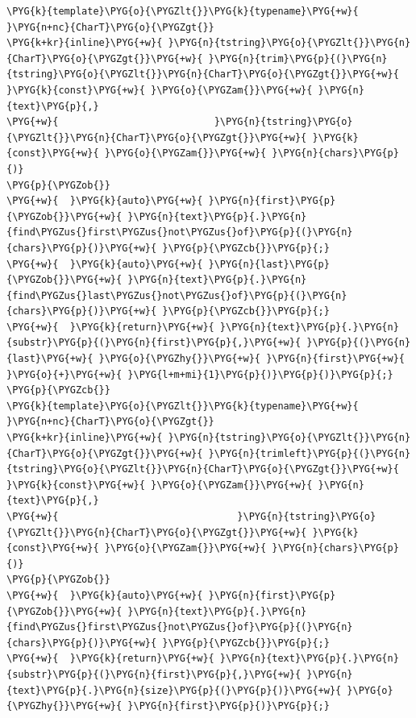 \begin{codeblockbg}
\begin{Verbatim}[commandchars=\\\{\},breaklines=true,breakanywhere=true,fontsize=\codefont,xleftmargin=17bp]
\PYG{k}{template}\PYG{o}{\PYGZlt{}}\PYG{k}{typename}\PYG{+w}{ }\PYG{n+nc}{CharT}\PYG{o}{\PYGZgt{}}
\PYG{k+kr}{inline}\PYG{+w}{ }\PYG{n}{tstring}\PYG{o}{\PYGZlt{}}\PYG{n}{CharT}\PYG{o}{\PYGZgt{}}\PYG{+w}{ }\PYG{n}{trim}\PYG{p}{(}\PYG{n}{tstring}\PYG{o}{\PYGZlt{}}\PYG{n}{CharT}\PYG{o}{\PYGZgt{}}\PYG{+w}{ }\PYG{k}{const}\PYG{+w}{ }\PYG{o}{\PYGZam{}}\PYG{+w}{ }\PYG{n}{text}\PYG{p}{,}
\PYG{+w}{                           }\PYG{n}{tstring}\PYG{o}{\PYGZlt{}}\PYG{n}{CharT}\PYG{o}{\PYGZgt{}}\PYG{+w}{ }\PYG{k}{const}\PYG{+w}{ }\PYG{o}{\PYGZam{}}\PYG{+w}{ }\PYG{n}{chars}\PYG{p}{)}
\PYG{p}{\PYGZob{}}
\PYG{+w}{  }\PYG{k}{auto}\PYG{+w}{ }\PYG{n}{first}\PYG{p}{\PYGZob{}}\PYG{+w}{ }\PYG{n}{text}\PYG{p}{.}\PYG{n}{find\PYGZus{}first\PYGZus{}not\PYGZus{}of}\PYG{p}{(}\PYG{n}{chars}\PYG{p}{)}\PYG{+w}{ }\PYG{p}{\PYGZcb{}}\PYG{p}{;}
\PYG{+w}{  }\PYG{k}{auto}\PYG{+w}{ }\PYG{n}{last}\PYG{p}{\PYGZob{}}\PYG{+w}{ }\PYG{n}{text}\PYG{p}{.}\PYG{n}{find\PYGZus{}last\PYGZus{}not\PYGZus{}of}\PYG{p}{(}\PYG{n}{chars}\PYG{p}{)}\PYG{+w}{ }\PYG{p}{\PYGZcb{}}\PYG{p}{;}
\PYG{+w}{  }\PYG{k}{return}\PYG{+w}{ }\PYG{n}{text}\PYG{p}{.}\PYG{n}{substr}\PYG{p}{(}\PYG{n}{first}\PYG{p}{,}\PYG{+w}{ }\PYG{p}{(}\PYG{n}{last}\PYG{+w}{ }\PYG{o}{\PYGZhy{}}\PYG{+w}{ }\PYG{n}{first}\PYG{+w}{ }\PYG{o}{+}\PYG{+w}{ }\PYG{l+m+mi}{1}\PYG{p}{)}\PYG{p}{)}\PYG{p}{;}
\PYG{p}{\PYGZcb{}}
\PYG{k}{template}\PYG{o}{\PYGZlt{}}\PYG{k}{typename}\PYG{+w}{ }\PYG{n+nc}{CharT}\PYG{o}{\PYGZgt{}}
\PYG{k+kr}{inline}\PYG{+w}{ }\PYG{n}{tstring}\PYG{o}{\PYGZlt{}}\PYG{n}{CharT}\PYG{o}{\PYGZgt{}}\PYG{+w}{ }\PYG{n}{trimleft}\PYG{p}{(}\PYG{n}{tstring}\PYG{o}{\PYGZlt{}}\PYG{n}{CharT}\PYG{o}{\PYGZgt{}}\PYG{+w}{ }\PYG{k}{const}\PYG{+w}{ }\PYG{o}{\PYGZam{}}\PYG{+w}{ }\PYG{n}{text}\PYG{p}{,}
\PYG{+w}{                               }\PYG{n}{tstring}\PYG{o}{\PYGZlt{}}\PYG{n}{CharT}\PYG{o}{\PYGZgt{}}\PYG{+w}{ }\PYG{k}{const}\PYG{+w}{ }\PYG{o}{\PYGZam{}}\PYG{+w}{ }\PYG{n}{chars}\PYG{p}{)}
\PYG{p}{\PYGZob{}}
\PYG{+w}{  }\PYG{k}{auto}\PYG{+w}{ }\PYG{n}{first}\PYG{p}{\PYGZob{}}\PYG{+w}{ }\PYG{n}{text}\PYG{p}{.}\PYG{n}{find\PYGZus{}first\PYGZus{}not\PYGZus{}of}\PYG{p}{(}\PYG{n}{chars}\PYG{p}{)}\PYG{+w}{ }\PYG{p}{\PYGZcb{}}\PYG{p}{;}
\PYG{+w}{  }\PYG{k}{return}\PYG{+w}{ }\PYG{n}{text}\PYG{p}{.}\PYG{n}{substr}\PYG{p}{(}\PYG{n}{first}\PYG{p}{,}\PYG{+w}{ }\PYG{n}{text}\PYG{p}{.}\PYG{n}{size}\PYG{p}{(}\PYG{p}{)}\PYG{+w}{ }\PYG{o}{\PYGZhy{}}\PYG{+w}{ }\PYG{n}{first}\PYG{p}{)}\PYG{p}{;}

\end{Verbatim}
\end{codeblockbg}
